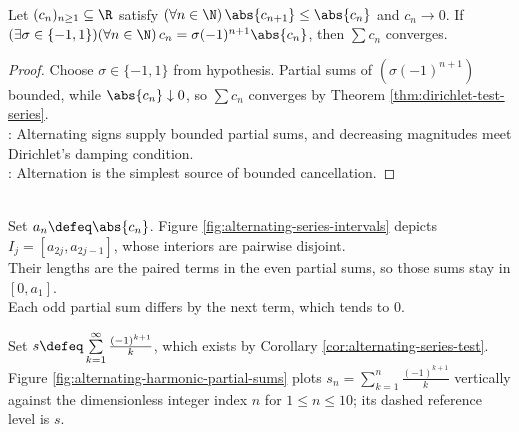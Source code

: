 \begin{corollary} \label{cor:alternating-series-test} \\
Let $(c_n)_{n\geq1}\subseteq\R$ satisfy $(\forall n\in\N)\,\abs{c_{n+1}}\leq\abs{c_n}$ and $c_n\to0$. If $(\exists\sigma\in\{-1,1\})(\forall n\in\N)\,c_n=\sigma(-1)^{n+1}\abs{c_n}$, then $\sum c_n$ converges.
\begin{proof}
Choose $\sigma\in\{-1,1\}$ from hypothesis. Partial sums of $(\sigma(-1)^{n+1})$ bounded, while $\abs{c_n}\downarrow0$, so $\sum c_n$ converges by Theorem \ref{thm:dirichlet-test-series}.\\
: Alternating signs supply bounded partial sums, and decreasing magnitudes meet Dirichlet's damping condition.\\
: Alternation is the simplest source of bounded cancellation.
\end{proof}
\end{corollary}

\begin{perspective} \label{per:alternating-series-interval-picture} \\
Set $a_n\defeq\abs{c_n}$. Figure \ref{fig:alternating-series-intervals} depicts $I_j=[a_{2j},a_{2j-1}]$, whose interiors are pairwise disjoint.\\
Their lengths are the paired terms in the even partial sums, so those sums stay in $[0,a_1]$.\\
Each odd partial sum differs by the next term, which tends to $0$.
\end{perspective}

\begin{illustrationfigure}[H]
  \centering
  
  \caption{For $a_n\defeq\abs{c_n}$, the ordered intervals $I_j=[a_{2j},a_{2j-1}]$ have pairwise disjoint interiors in $[0,a_1]$.}
  \label{fig:alternating-series-intervals}
\end{illustrationfigure}

Set $s\defeq\sum\limits_{k=1}^{\infty}\frac{(-1)^{k+1}}{k}$, which exists by Corollary \ref{cor:alternating-series-test}. Figure \ref{fig:alternating-harmonic-partial-sums} plots $s_n=\sum\limits_{k=1}^{n}\frac{(-1)^{k+1}}{k}$ vertically against the dimensionless integer index $n$ for $1\leq n\leq10$; its dashed reference level is $s$.

\begin{visualizationfigure}[H]
  \centering
  
  \caption{Odd partial sums (blue) decrease and even partial sums (orange) increase toward the series sum $s$.}
  \label{fig:alternating-harmonic-partial-sums}
\end{visualizationfigure}

